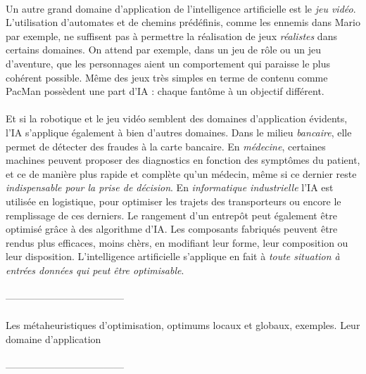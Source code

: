 \paragraph{} Un autre grand domaine d'application de l'intelligence artificielle est le \emph{jeu vidéo}. L'utilisation 
d'automates et de chemins prédéfinis, comme les ennemis dans Mario par exemple, ne suffisent pas à permettre la réalisation
de jeux \emph{réalistes} dans certains domaines. On attend par exemple, dans un jeu de rôle ou un jeu d'aventure, que les
personnages aient un comportement qui paraisse le plus cohérent possible. Même des jeux très simples en terme de contenu
comme PacMan possèdent une part d'IA : chaque fantôme à un objectif différent.

\paragraph{} Et si la robotique et le jeu vidéo semblent des domaines d'application évidents, l'IA s'applique également
à bien d'autres domaines. Dans le milieu \emph{bancaire}, elle permet de détecter des fraudes à la carte bancaire. En
\emph{médecine}, certaines machines peuvent proposer des diagnostics en fonction des symptômes du patient, et ce de
manière plus rapide et complète qu'un médecin, même si ce dernier reste \emph{indispensable pour la prise de décision}.
En \emph{informatique industrielle} l'IA est utilisée en logistique, pour optimiser les trajets des transporteurs ou 
encore le remplissage de ces derniers. Le rangement d'un entrepôt peut également être optimisé grâce à des algorithme d'IA.
Les composants fabriqués peuvent être rendus plus efficaces, moins chèrs, en modifiant leur forme, leur composition ou 
leur disposition. L'intelligence artificielle s'applique en fait à \emph{toute situation à entrées données qui peut
être optimisable}. 

\paragraph{} ------------------------------------

\paragraph{} Les métaheuristiques d'optimisation, optimums locaux et globaux, exemples. 
Leur domaine d'application

\paragraph{} ------------------------------------

